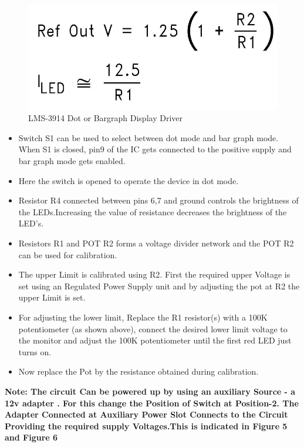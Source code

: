 \documentclass[11pt,a4paper]{article}
\begin{document}
\newpage
	\begin{figure}[h!]
		\includegraphics[scale=0.3]{eq.jpg}
		\centering	
		\caption{LMS-3914 Dot or Bargraph Display Driver}
	\end{figure}
	
\begin{itemize}
\item Switch S1 can be used to select between dot mode and bar graph mode. When S1 is
closed, pin9 of the IC gets connected to the positive supply and bar graph mode gets enabled.
\item Here the switch is opened to operate the device in dot mode.
    \item Resistor R4 connected between pins 6,7 and ground controls the brightness
    of the LEDs.Increasing the value of resistance decreases the brightness of the LED's.
    
    \item  Resistors R1 and POT R2 forms a voltage divider network and the POT R2 can be used for calibration.
    
    \item The upper Limit is calibrated using R2. First the required upper Voltage is set using an Regulated Power Supply unit and by adjusting the pot at R2  the upper Limit is set.
    \item For adjusting the lower limit, Replace the R1 resistor(s) with a 100K potentiometer (as shown above), connect the desired lower limit voltage to the monitor and adjust the 100K potentiometer until the first red LED just turns on.
    \item Now replace the Pot by the resistance obtained during calibration.
\end{itemize}

\textbf{Note: The circuit Can be powered up by using an auxiliary Source - a 12v adapter . For this change the Position of Switch at Position-2. The Adapter Connected at Auxiliary Power Slot Connects to the Circuit Providing the required supply Voltages.This is indicated in Figure 5 and Figure 6}
\end{document}
